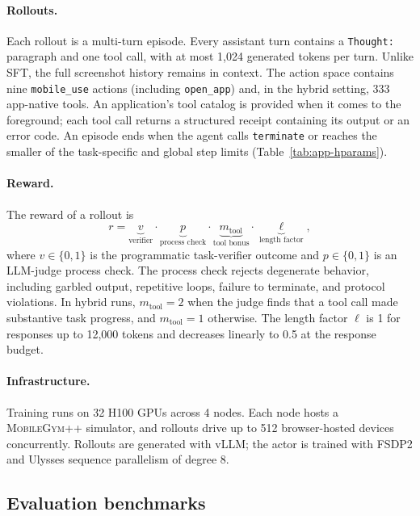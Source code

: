 \paragraph{Rollouts.}
Each rollout is a multi-turn episode. Every assistant turn contains a \texttt{Thought:} paragraph and one tool call, with at most 1,024 generated tokens per turn. Unlike SFT, the full screenshot history remains in context. The action space contains nine \texttt{mobile\_use} actions (including \texttt{open\_app}) and, in the hybrid setting, 333 app-native tools. An application's tool catalog is provided when it comes to the foreground; each tool call returns a structured receipt containing its output or an error code. An episode ends when the agent calls \texttt{terminate} or reaches the smaller of the task-specific and global step limits (Table~\ref{tab:app-hparams}).

\paragraph{Reward.}
The reward of a rollout is
\begin{equation*}
r = \underbrace{v}_{\text{verifier}} \cdot \underbrace{p}_{\text{process check}} \cdot \underbrace{m_{\text{tool}}}_{\text{tool bonus}} \cdot \underbrace{\ell}_{\text{length factor}},
\end{equation*}
where $v\in\{0,1\}$ is the programmatic task-verifier outcome and $p\in\{0,1\}$ is an LLM-judge process check. The process check rejects degenerate behavior, including garbled output, repetitive loops, failure to terminate, and protocol violations. In hybrid runs, $m_{\text{tool}}=2$ when the judge finds that a tool call made substantive task progress, and $m_{\text{tool}}=1$ otherwise. The length factor $\ell$ is 1 for responses up to 12,000 tokens and decreases linearly to 0.5 at the response budget.

\paragraph{Infrastructure.}
Training runs on 32 H100 GPUs across 4 nodes. Each node hosts a \textsc{MobileGym++} simulator, and rollouts drive up to 512 browser-hosted devices concurrently. Rollouts are generated with vLLM; the actor is trained with FSDP2 and Ulysses sequence parallelism of degree 8.

\subsection{Evaluation benchmarks}
\label{app:eval-bench}

